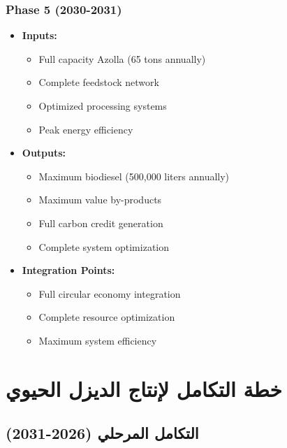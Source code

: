\subsubsection{Phase 5 (2030-2031)}
\begin{itemize}
    \item \textbf{Inputs:}
    \begin{itemize}
        \item Full capacity Azolla (65 tons annually)
        \item Complete feedstock network
        \item Optimized processing systems
        \item Peak energy efficiency
    \end{itemize}
    \item \textbf{Outputs:}
    \begin{itemize}
        \item Maximum biodiesel (500,000 liters annually)
        \item Maximum value by-products
        \item Full carbon credit generation
        \item Complete system optimization
    \end{itemize}
    \item \textbf{Integration Points:}
    \begin{itemize}
        \item Full circular economy integration
        \item Complete resource optimization
        \item Maximum system efficiency
    \end{itemize}
\end{itemize}

\section{خطة التكامل لإنتاج الديزل الحيوي}

\subsection{التكامل المرحلي (2026-2031)}

